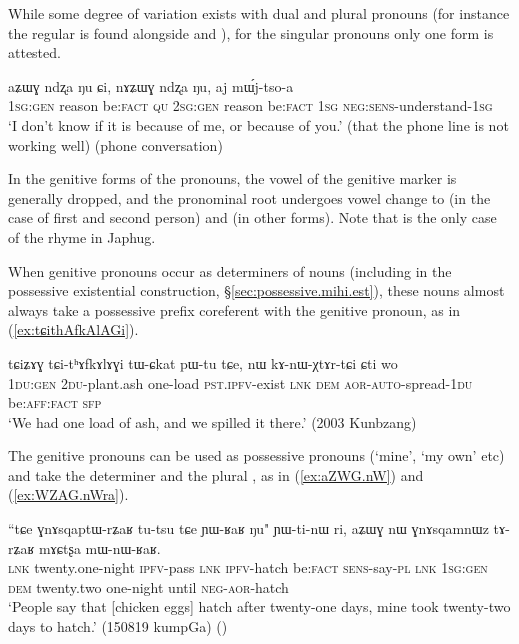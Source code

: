While some degree of variation exists with dual and plural pronouns (for instance the regular  is found alongside  and ), for the singular pronouns only one form is attested.

\begin{exe}
\ex
\gll aʑɯɣ 	ndʐa 	ŋu 	ɕi, 	nɤʑɯɣ 	ndʐa 	ŋu, 	aj 	mɯ́j-tso-a   \\
\textsc{1sg}:\textsc{gen} reason be:\textsc{fact} \textsc{qu} \textsc{2sg}:\textsc{gen} reason be:\textsc{fact} \textsc{1sg} \textsc{neg}:\textsc{sens}-understand-\textsc{1sg} \\
\glt  `I don't know if it is because of me, or because of you.' (that the phone line is not working well) (phone conversation) 
\end{exe} 

In the genitive forms of the pronouns, the vowel of the genitive marker is generally dropped, and the pronominal root  undergoes vowel change to  (in the case of first and second person) and  (in other forms). Note that  is the only case of the rhyme  in Japhug.

When genitive pronouns occur as determiners of nouns (including in the possessive existential construction, §\ref{sec:possessive.mihi.est}), these nouns almost always take a possessive prefix coreferent with the genitive pronoun, as in (\ref{ex:tɕithAfkAlAGi}).

\begin{exe}
\ex \label{ex:tɕithAfkAlAGi}
\gll 
tɕiʑɤɣ tɕi-tʰɤfkɤlɤɣi tɯ-ɕkat pɯ-tu tɕe, nɯ kɤ-nɯ-χtɤr-tɕi ɕti wo \\
\textsc{1du}:\textsc{gen} \textsc{2du}-plant.ash one-load \textsc{pst}.\textsc{ipfv}-exist \textsc{lnk} \textsc{dem} \textsc{aor}-\textsc{auto}-spread-\textsc{1du} be:\textsc{aff}:\textsc{fact} \textsc{sfp} \\
\glt `We had one load of ash, and we spilled it there.' (2003 Kunbzang)
\end{exe} 

The genitive pronouns can be used as possessive pronouns (`mine', `my own' etc) and take the determiner  and the plural , as in (\ref{ex:aZWG.nW}) and (\ref{ex:WZAG.nWra}).

\begin{exe}
\ex \label{ex:aZWG.nW}
\gll ``tɕe ɣnɤsqaptɯ-rʑaʁ tu-tsu tɕe ɲɯ-ʁaʁ ŋu" ɲɯ-ti-nɯ ri, aʑɯɣ nɯ ɣnɤsqamnɯz tɤ-rʑaʁ mɤɕtʂa mɯ-nɯ-ʁaʁ. \\
\textsc{lnk} twenty.one-night \textsc{ipfv}-pass \textsc{lnk} \textsc{ipfv}-hatch be:\textsc{fact} \textsc{sens}-say-\textsc{pl} \textsc{lnk} \textsc{1sg}:\textsc{gen} \textsc{dem} twenty.two one-night  until \textsc{neg}-\textsc{aor}-hatch \\
\glt `People say that [chicken eggs] hatch after twenty-one days, mine took twenty-two days to hatch.' (150819 kumpGa)
()
\end{exe} 

